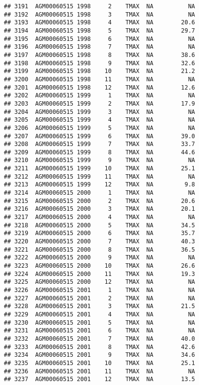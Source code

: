 \documentclass{article}\usepackage[]{graphicx}\usepackage[]{color}
\makeatletter
\newenvironment{kframe}{%
 \def\at@end@of@kframe{}%
 \ifinner\ifhmode%
  \def\at@end@of@kframe{\end{minipage}}%
  \begin{minipage}{\columnwidth}%
 \fi\fi%
 \def\FrameCommand##1{\hskip\@totalleftmargin \hskip-\fboxsep
 \colorbox{shadecolor}{##1}\hskip-\fboxsep
     \hskip-\linewidth \hskip-\@totalleftmargin \hskip\columnwidth}%
 \MakeFramed {\advance\hsize-\width
   \@totalleftmargin\z@ \linewidth\hsize
   \@setminipage}}%
 {\par\unskip\endMakeFramed%
 \at@end@of@kframe}
\newenvironment{knitrout}{}{} %
\makeatother
\begin{document}
\begin{knitrout}
\begin{kframe}
\begin{verbatim}
## 3191  AGM00060515 1998     2    TMAX  NA          NA
## 3192  AGM00060515 1998     3    TMAX  NA          NA
## 3193  AGM00060515 1998     4    TMAX  NA        20.6
## 3194  AGM00060515 1998     5    TMAX  NA        29.7
## 3195  AGM00060515 1998     6    TMAX  NA          NA
## 3196  AGM00060515 1998     7    TMAX  NA          NA
## 3197  AGM00060515 1998     8    TMAX  NA        38.6
## 3198  AGM00060515 1998     9    TMAX  NA        32.6
## 3199  AGM00060515 1998    10    TMAX  NA        21.2
## 3200  AGM00060515 1998    11    TMAX  NA          NA
## 3201  AGM00060515 1998    12    TMAX  NA        12.6
## 3202  AGM00060515 1999     1    TMAX  NA          NA
## 3203  AGM00060515 1999     2    TMAX  NA        17.9
## 3204  AGM00060515 1999     3    TMAX  NA          NA
## 3205  AGM00060515 1999     4    TMAX  NA          NA
## 3206  AGM00060515 1999     5    TMAX  NA          NA
## 3207  AGM00060515 1999     6    TMAX  NA        39.0
## 3208  AGM00060515 1999     7    TMAX  NA        33.7
## 3209  AGM00060515 1999     8    TMAX  NA        44.6
## 3210  AGM00060515 1999     9    TMAX  NA          NA
## 3211  AGM00060515 1999    10    TMAX  NA        25.1
## 3212  AGM00060515 1999    11    TMAX  NA          NA
## 3213  AGM00060515 1999    12    TMAX  NA         9.8
## 3214  AGM00060515 2000     1    TMAX  NA          NA
## 3215  AGM00060515 2000     2    TMAX  NA        20.6
## 3216  AGM00060515 2000     3    TMAX  NA        20.1
## 3217  AGM00060515 2000     4    TMAX  NA          NA
## 3218  AGM00060515 2000     5    TMAX  NA        34.5
## 3219  AGM00060515 2000     6    TMAX  NA        35.7
## 3220  AGM00060515 2000     7    TMAX  NA        40.3
## 3221  AGM00060515 2000     8    TMAX  NA        36.5
## 3222  AGM00060515 2000     9    TMAX  NA          NA
## 3223  AGM00060515 2000    10    TMAX  NA        26.6
## 3224  AGM00060515 2000    11    TMAX  NA        19.3
## 3225  AGM00060515 2000    12    TMAX  NA          NA
## 3226  AGM00060515 2001     1    TMAX  NA          NA
## 3227  AGM00060515 2001     2    TMAX  NA          NA
## 3228  AGM00060515 2001     3    TMAX  NA        21.5
## 3229  AGM00060515 2001     4    TMAX  NA          NA
## 3230  AGM00060515 2001     5    TMAX  NA          NA
## 3231  AGM00060515 2001     6    TMAX  NA          NA
## 3232  AGM00060515 2001     7    TMAX  NA        40.0
## 3233  AGM00060515 2001     8    TMAX  NA        42.6
## 3234  AGM00060515 2001     9    TMAX  NA        34.6
## 3235  AGM00060515 2001    10    TMAX  NA        25.1
## 3236  AGM00060515 2001    11    TMAX  NA          NA
## 3237  AGM00060515 2001    12    TMAX  NA        13.5

\end{verbatim}
\end{kframe}
\end{knitrout}
\end{document}
